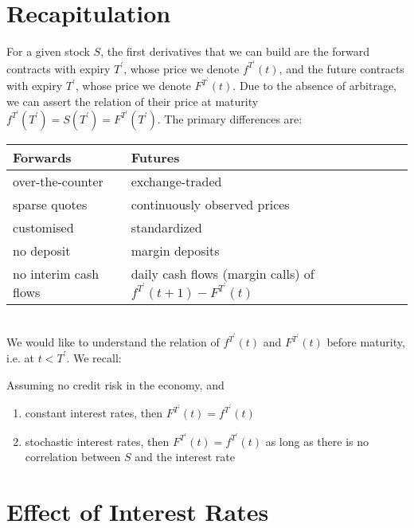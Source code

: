 \documentclass[11pt]{article}
\date{Lecture 3 (22 Jan. 2013)}
\begin{document}
{\small \maketitle}

\section{Recapitulation}
For a given stock $S$, the first derivatives that we can build are the forward contracts with expiry $T^\prime$, whose price we denote $f^{T^\prime}(t)$, and the future contracts with expiry $T^\prime$, whose price we denote $F^{T^\prime}(t)$. Due to the absence of arbitrage, we can assert the relation of their price at maturity $f^{T^\prime}(T^\prime) = S(T^\prime) = F^{T^\prime}(T^\prime)$. The primary differences are: \\

\begin{tabular}{l | l}
Forwards & Futures \\
\hline
over-the-counter & exchange-traded \\
sparse quotes & continuously observed prices \\
customised & standardized \\
no deposit & margin deposits \\
no interim cash flows & daily cash flows (margin calls) of $f^{T^\prime}(t + 1) - F^{T^\prime}(t)$ \\
\end{tabular} \\

We would like to understand the relation of $f^{T^\prime}(t)$ and $F^{T^\prime}(t)$ before maturity, i.e. at $t < T^\prime$. We recall:

\begin{theorem} Assuming no credit risk in the economy, and
\begin{enumerate}
\item constant interest rates, then $F^{T^\prime}(t) = f^{T^\prime}(t)$
\item stochastic interest rates, then $F^{T^\prime}(t) = f^{T^\prime}(t)$ as long as there is no correlation between $S$ and the interest rate
\end{enumerate}
\end{theorem}

\section{Effect of Interest Rates}
\end{document}
